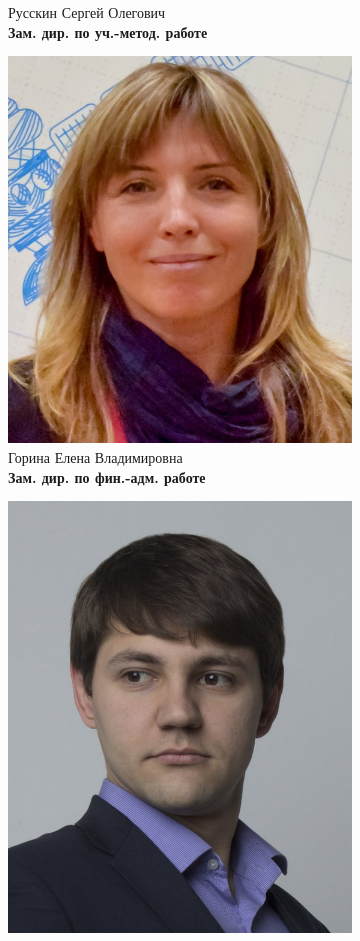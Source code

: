 \documentclass[14pt]{extarticle}
\begin{document}
\begin{figure}[h!]
\begin{subfigure}[b]{0.5\linewidth}
        \caption{Русскин Сергей Олегович \\ \textbf{Зам. дир. по уч.-метод. работе}}
    \end{subfigure}
    \begin{subfigure}[b]{0.32\linewidth}
        \centering
        \includegraphics[width=0.75\linewidth]{resources/gorin.jpg}
        \caption{Горина Елена Владимировна \\ \textbf{Зам. дир. по
        фин.-адм. работе}}
    \end{subfigure}
    \begin{subfigure}[b]{0.32\linewidth}
        \centering
        \includegraphics[width=0.75\linewidth]{resources/yakov.jpg}

\end{subfigure}
\end{figure}
\end{document}
